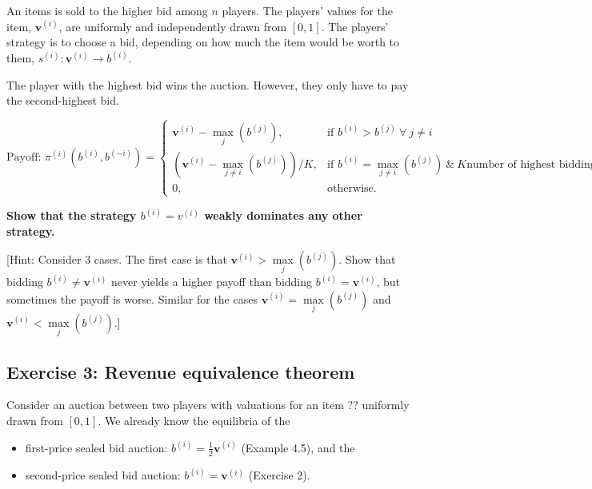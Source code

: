 \documentclass[10pt]{article}
\begin{document}
An items is sold to the higher bid among \(n\) players. The players' values for
the item, \(\mathbf{v}^{(i)}\), are uniformly and independently drawn from \([0, 1]\).
The players' strategy is to choose a bid, depending on how much the item would be
worth to them, \(s^{(i)}: \mathbf{v}^{(i)} \rightarrow b^{(i)}\).

The player with the highest bid wins the auction. However, they only have to
pay the second-highest bid.

\begin{equation*}
\text{Payoff: }    \pi^{(i)} (b^{(i)}, b^{(-i)}) = 
    \begin{cases}
        \mathbf{v}^{(i)} - \max\limits_j(b^{(j)}), & \text{if } b^{(i)} > b^{(j)} \ \forall \ j \neq i \\
        (\mathbf{v}^{(i)} - \max\limits_{j \neq i}(b^{(j)})) / K, & \text{if } b^{(i)} = \max\limits_{j \neq i} (b^{(j)}) \ \& \ K \text{number of highest biddings}\\
        0,              & \text{otherwise}.
    \end{cases}
\end{equation*}

\textbf{Show that the strategy \(b^{(i)} = v^{(i)}\) weakly dominates any other
strategy.}

[Hint: Consider 3 cases. The first case is that \(\textbf{v}^{(i)} > \max\limits_j (b^{(j)})\).
Show that bidding \(b^{(i)} \neq \textbf{v}^{(i)}\) never yields a higher payoff than bidding
\(b^{(i)} = \textbf{v}^{(i)}\), but sometimes the payoff is worse. Similar for the cases
\(\textbf{v}^{(i)} = \max\limits_j (b^{(j)})\) and \(\textbf{v}^{(i)} < \max\limits_j (b^{(j)})\).]


\subsection*{Exercise 3: Revenue equivalence theorem}

Consider an auction between two players with valuations for an item ?? uniformly
drawn from \([0, 1]\). We already know the equilibria of the


\begin{itemize}
    \item first-price sealed bid auction: \(b ^ {(i)} =  \frac{1}{2} \textbf{v}^{(i)}\) (Example 4.5), and the
    \item second-price sealed bid auction: \(b ^ {(i)} =  \textbf{v}^{(i)}\) (Exercise 2).
\end{itemize}
\end{document}
